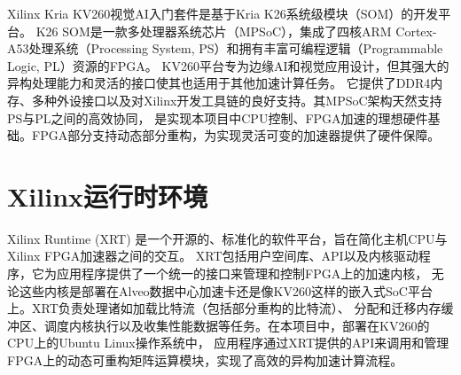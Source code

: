 Xilinx Kria KV260视觉AI入门套件是基于Kria K26系统级模块（SOM）的开发平台。
K26 SOM是一款多处理器系统芯片（MPSoC），集成了四核ARM Cortex-A53处理系统（Processing System, PS）和拥有丰富可编程逻辑（Programmable Logic, PL）资源的FPGA。
KV260平台专为边缘AI和视觉应用设计，但其强大的异构处理能力和灵活的接口使其也适用于其他加速计算任务。
它提供了DDR4内存、多种外设接口以及对Xilinx开发工具链的良好支持。其MPSoC架构天然支持PS与PL之间的高效协同，
是实现本项目中CPU控制、FPGA加速的理想硬件基础。FPGA部分支持动态部分重构，为实现灵活可变的加速器提供了硬件保障。

\section{Xilinx运行时环境}

Xilinx Runtime (XRT) 是一个开源的、标准化的软件平台，旨在简化主机CPU与Xilinx FPGA加速器之间的交互。
XRT包括用户空间库、API以及内核驱动程序，它为应用程序提供了一个统一的接口来管理和控制FPGA上的加速内核，
无论这些内核是部署在Alveo数据中心加速卡还是像KV260这样的嵌入式SoC平台上。XRT负责处理诸如加载比特流（包括部分重构的比特流）、
分配和迁移内存缓冲区、调度内核执行以及收集性能数据等任务。在本项目中，部署在KV260的CPU上的Ubuntu Linux操作系统中，
应用程序通过XRT提供的API来调用和管理FPGA上的动态可重构矩阵运算模块，实现了高效的异构加速计算流程。
